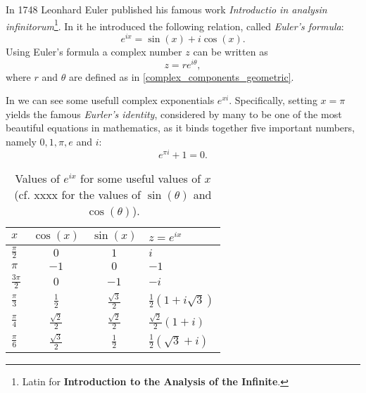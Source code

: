 In 1748 Leonhard Euler published his famous work \textit{Introductio in analysin infinitorum}\footnote{Latin for \textbf{Introduction to the Analysis of the Infinite}.}. In it he introduced the following relation, called \emph{Euler's formula}:
\begin{equation}
	e^{ix} = \sin(x) + i\cos(x).
	\label{eq:Euler's_formula}
\end{equation}
Using Euler's formula a complex number $z$ can be written as
\begin{equation}
	z = re^{i\theta},
	\label{eq:complex number using Eurler's formula}
\end{equation}
where $r$ and $\theta$ are defined as in \eqref{complex_components_geometric}.

In  we can see some usefull complex exponentials $e^{xi}$. Specifically, setting $x=\pi$ yields the famous \emph{Eurler's identity}, considered by many to be one of the most beautiful equations in mathematics, as it binds together five important numbers, namely $0,1,\pi,e$ and $i$:
\begin{equation}
	e^{\pi i} + 1 = 0.
	\label{eq:Euler's identity}
\end{equation}

\begin{table}[H]
	\centering
	\caption{Values of $e^{ix}$ for some useful values of $x$ (cf. xxxx for the values of $\sin(\theta)$ and $\cos(\theta)$).}
	\label{tab:complex_exponentials}
	\begin{tabular}{lccl}
		\toprule
		$x$ & $\cos(x)$ & $\sin(x)$ & $z=e^{ix}$\\
		\midrule
		$\frac{\pi}{2}$ & $0$ & $1$ & $i$\\
		$\pi$ & $-1$ & $0$ & $-1$\\
		$\frac{3\pi}{2}$ & $0$ & $-1$ & $-i$\\
		$\frac{\pi}{3}$ & $\frac{1}{2}$ & $\frac{\sqrt{3}}{2}$ & $\frac{1}{2}\left( 1+i\sqrt{3} \right)$\\
		$\frac{\pi}{4}$ & $\frac{\sqrt{2}}{2}$ & $\frac{\sqrt{2}}{2}$ & $\frac{\sqrt{2}}{2}\left( 1+i \right)$\\
		$\frac{\pi}{6}$ & $\frac{\sqrt{3}}{2}$ & $\frac{1}{2}$ & $\frac{1}{2}\left( \sqrt{3}+i \right)$\\
		\bottomrule
	\end{tabular}
\end{table}
